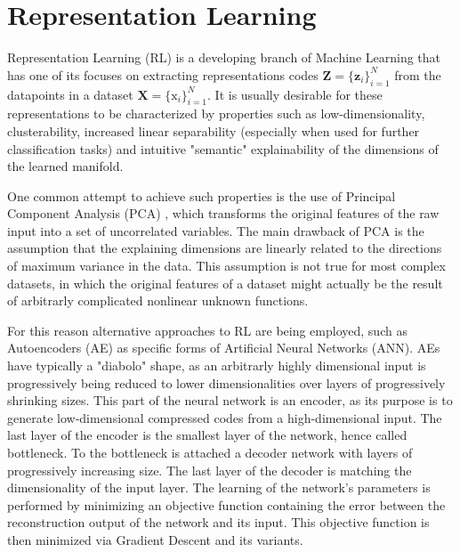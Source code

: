 \section{Representation Learning}
Representation Learning (RL) is a developing branch of Machine Learning that has one of its
focuses on extracting representations codes $\mathbf{Z} = \{\mathbf{z}_i\}_{i=1}^N$ from the datapoints in a dataset $\mathbf{X} = \{\mathrm{x}_i\}_{i=1}^N$.
It is usually desirable for these representations to be characterized by properties such as low-dimensionality, clusterability, increased linear separability (especially when used for further classification tasks) and intuitive "semantic" explainability of the dimensions of the learned manifold.

One common attempt to achieve such properties is the use of Principal Component Analysis (PCA) , which transforms the original features of the raw input into a set of uncorrelated variables.
The main drawback of PCA is the assumption that the explaining dimensions are linearly related to the directions of maximum variance in the data.
This assumption is not true for most complex datasets, in which the original features of a dataset might actually be the result of arbitrarly complicated nonlinear unknown functions.

For this reason alternative approaches to RL are being employed, such as Autoencoders (AE) as specific forms of Artificial Neural Networks (ANN).
AEs have typically a "diabolo" shape, as an arbitrarly highly dimensional input is progressively being reduced to lower dimensionalities over layers of progressively shrinking sizes.
This part of the neural network is an encoder, as its purpose is to generate low-dimensional compressed codes from a high-dimensional input.
The last layer of the encoder is the smallest layer of the network, hence called bottleneck.
To the bottleneck is attached a decoder network with layers of progressively increasing size.
The last layer of the decoder is matching the dimensionality of the input layer.
The learning of the network's parameters is performed by minimizing an objective function containing the error between the reconstruction output of the network and its input.
This objective function is then minimized via Gradient Descent and its variants.
